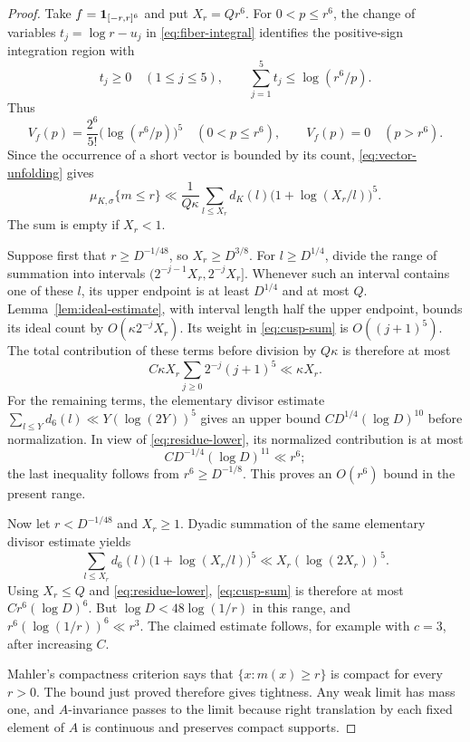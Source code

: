 \begin{proof}
Take $f=\mathbf 1_{[-r,r]^6}$ and put $X_r=Qr^6$.  For $0<p\le r^6$,
the change of variables $t_j=\log r-u_j$ in
\eqref{eq:fiber-integral} identifies the positive-sign integration
region with
\[
 t_j\ge0\quad(1\le j\le5),\qquad
 \sum_{j=1}^5t_j\le\log(r^6/p).
\]
Thus
\[
 V_f(p)=\frac{2^6}{5!}\bigl(\log(r^6/p)\bigr)^5
       \quad(0<p\le r^6),
 \qquad V_f(p)=0\quad(p>r^6).
\]
Since the occurrence of a short vector is bounded by its count,
\eqref{eq:vector-unfolding} gives
\begin{equation}
 \mu_{K,\sigma}\{m\le r\}
 \ll\frac1{Q\kappa}
       \sum_{l\le X_r}d_K(l)
                   \bigl(1+\log(X_r/l)\bigr)^5.          \label{eq:cusp-sum}
\end{equation}
The sum is empty if $X_r<1$.

Suppose first that $r\ge D^{-1/48}$, so $X_r\ge D^{3/8}$.
For $l\ge D^{1/4}$, divide the range of summation into intervals
$(2^{-j-1}X_r,2^{-j}X_r]$.  Whenever such an interval contains one
of these $l$, its upper endpoint is at least $D^{1/4}$ and at most
$Q$.  Lemma~\ref{lem:ideal-estimate}, with interval length half the
upper endpoint, bounds its ideal count by
$O(\kappa 2^{-j}X_r)$.  Its weight in \eqref{eq:cusp-sum} is
$O((j+1)^5)$.  The total contribution of these terms before division
by $Q\kappa$ is therefore at most
\[
 C\kappa X_r\sum_{j\ge0}2^{-j}(j+1)^5\ll\kappa X_r.
\]
For the remaining terms, the elementary divisor estimate
$\sum_{l\le Y}d_6(l)\ll Y(\log(2Y))^5$ gives an upper bound
$CD^{1/4}(\log D)^{10}$ before normalization.  In view of
\eqref{eq:residue-lower}, its normalized contribution is at most
\[
 CD^{-1/4}(\log D)^{11}\ll r^6;
\]
the last inequality follows from $r^6\ge D^{-1/8}$.
This proves an $O(r^6)$ bound in the present range.

Now let $r<D^{-1/48}$ and $X_r\ge1$.  Dyadic summation of the
same elementary divisor estimate yields
\[
 \sum_{l\le X_r}d_6(l)\bigl(1+\log(X_r/l)\bigr)^5
      \ll X_r(\log(2X_r))^5.
\]
Using $X_r\le Q$ and \eqref{eq:residue-lower},
\eqref{eq:cusp-sum} is therefore at most
$Cr^6(\log D)^6$.  But $\log D<48\log(1/r)$ in this range, and
$r^6(\log(1/r))^6\ll r^3$.  The claimed estimate follows, for
example with $c=3$, after increasing $C$.

Mahler's compactness criterion says that
$\{x:m(x)\ge r\}$ is compact for every $r>0$.  The bound just proved
therefore gives tightness.  Any weak limit has mass one, and
$A$-invariance passes to the limit because right translation by each
fixed element of $A$ is continuous and preserves compact supports.
\end{proof}

